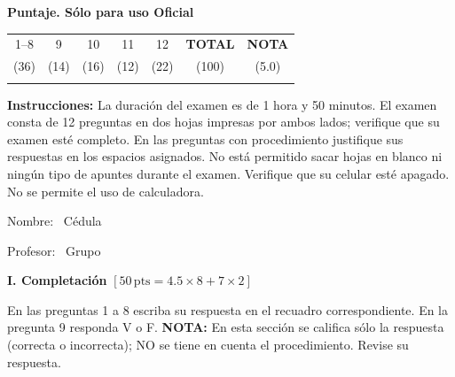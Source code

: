 \documentclass[11pt]{article}
\begin{document}
\examheader

\vspace{4pt}
\noindent
\begin{minipage}[t]{0.75\linewidth}
\textbf{Puntaje. Sólo para uso Oficial}\\[4pt]
\begin{tabular}{|c|c|c|c|c|c|c|}
\hline
1--8 & 9 & 10 & 11 & 12 & \textbf{TOTAL} & \textbf{NOTA} \\
(36) & (14) & (16) & (12) & (22) & (100) & (5.0) \\ \hline
 & & & & & & \\ \hline
\end{tabular}
\end{minipage}

\vspace{6pt}
\noindent\textbf{Instrucciones:} La duración del examen es de 1 hora y 50 minutos. El examen consta de 12 preguntas en dos hojas impresas por ambos lados; verifique que su examen esté completo. En las preguntas con procedimiento justifique sus respuestas en los espacios asignados. No está permitido sacar hojas en blanco ni ningún tipo de apuntes durante el examen. Verifique que su celular esté apagado. No se permite el uso de calculadora.

\vspace{8pt}
\noindent Nombre: \dotfill\ Cédula \dotfill

\vspace{4pt}
\noindent Profesor: \dotfill\ Grupo \dotfill

\vspace{10pt}
\begin{center}\textbf{I. Completación} $[50\,\mathrm{pts} = 4.5\times 8 + 7\times 2]$\end{center}

\noindent En las preguntas 1 a 8 escriba su respuesta en el recuadro correspondiente. En la pregunta 9 responda V o F. \textbf{NOTA:} En esta sección se califica sólo la respuesta (correcta o incorrecta); NO se tiene en cuenta el procedimiento. Revise su respuesta.
\end{document}
